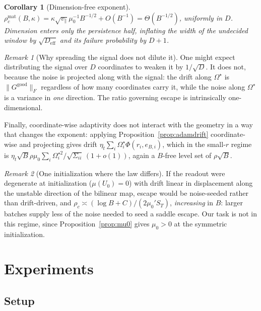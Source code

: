 \documentclass{article}
\theoremstyle{plain}
\newtheorem{corollary}{Corollary}
\theoremstyle{definition}
\theoremstyle{remark}
\newtheorem{remark}{Remark}
\newcommand{\1}{\mathbf{1}}
\newcommand{\good}{\mathrm{good}}
\newcommand{\Om}{\Omega}
\begin{document}
\begin{corollary}[Dimension-free exponent]
\label{cor:dimfree}
$\rho_c^{\mathrm{mat}}(B,\kappa) = \kappa\sqrt{v_\parallel}\mu_0^{-1}B^{-1/2}
+O(B^{-1}) = \Theta(B^{-1/2})$, uniformly in $D$. Dimension enters only the
persistence half, inflating the width of the undecided window by
$\sqrt{D_{\mathrm{eff}}}$ and its failure probability by $D+1$.
\end{corollary}

\begin{remark}[Why spreading the signal does not dilute it]
\label{rem:spread}
One might expect distributing the signal over $D$ coordinates to weaken it by
$1/\sqrt D$. It does not, because the noise is projected along with the signal:
the drift along $\Om^\star$ is $\|G^\good\|_F$ regardless of how many coordinates
carry it, while the noise along $\Om^\star$ is a variance in \emph{one}
direction. The ratio governing escape is intrinsically one-dimensional.
\end{remark}

Finally, coordinate-wise adaptivity does not interact with the geometry in a way
that changes the exponent: applying Proposition~\ref{prop:adamdrift}
coordinate-wise and projecting gives drift
$\eta_t\sum_i\Om^\star_i\Phi(r_i,e_{B,i})$, which in the small-$r$ regime is
$\eta_t\sqrt B\rho\mu_0\sum_i\Om^{\star2}_i/\sqrt{\Sigma_{ii}}\,(1+o(1))$, again
a $B$-free level set of $\rho\sqrt B$.

\begin{remark}[One initialization where the law differs]
\label{rem:saddle}
If the readout were degenerate at initialization ($\mu(U_0) = 0$) with drift
linear in displacement along the unstable direction of the bilinear map, escape
would be noise-seeded rather than drift-driven, and
$\rho_c\asymp(\log B+C)/(2\mu_0'S_T)$, \emph{increasing} in $B$: larger batches
supply less of the noise needed to seed a saddle escape. Our task is not in this
regime, since Proposition~\ref{prop:mu0} gives $\mu_0>0$ at the symmetric
initialization.
\end{remark}

\section{Experiments}
\label{sec:experiments}

\subsection{Setup}
\end{document}

